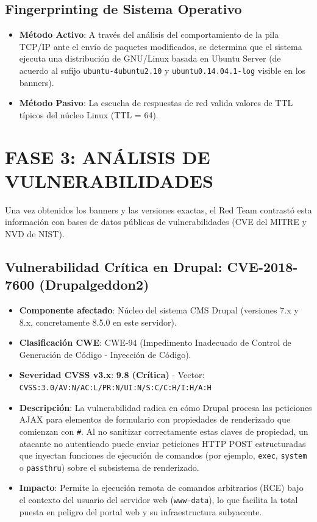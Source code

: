 \documentclass[11pt,a4paper]{article}
\begin{document}
\subsection{Fingerprinting de Sistema Operativo}
\begin{itemize}
    \item \textbf{Método Activo}: A través del análisis del comportamiento de la pila TCP/IP ante el envío de paquetes modificados, se determina que el sistema ejecuta una distribución de GNU/Linux basada en Ubuntu Server (de acuerdo al sufijo \texttt{ubuntu-4ubuntu2.10} y \texttt{ubuntu0.14.04.1-log} visible en los banners).
    \item \textbf{Método Pasivo}: La escucha de respuestas de red valida valores de TTL típicos del núcleo Linux (TTL = 64).
\end{itemize}


\section{FASE 3: ANÁLISIS DE VULNERABILIDADES}
Una vez obtenidos los banners y las versiones exactas, el Red Team contrastó esta información con bases de datos públicas de vulnerabilidades (CVE del MITRE y NVD de NIST).

\subsection{Vulnerabilidad Crítica en Drupal: CVE-2018-7600 (Drupalgeddon2)}
\begin{itemize}
    \item \textbf{Componente afectado}: Núcleo del sistema CMS Drupal (versiones 7.x y 8.x, concretamente 8.5.0 en este servidor).
    \item \textbf{Clasificación CWE}: CWE-94 (Impedimento Inadecuado de Control de Generación de Código - Inyección de Código).
    \item \textbf{Severidad CVSS v3.x}: \textbf{9.8 (Crítica)} - Vector: \texttt{CVSS:3.0/AV:N/AC:L/PR:N/UI:N/S:C/C:H/I:H/A:H}
    \item \textbf{Descripción}: La vulnerabilidad radica en cómo Drupal procesa las peticiones AJAX para elementos de formulario con propiedades de renderizado que comienzan con \texttt{\#}. Al no sanitizar correctamente estas claves de propiedad, un atacante no autenticado puede enviar peticiones HTTP POST estructuradas que inyectan funciones de ejecución de comandos (por ejemplo, \texttt{exec}, \texttt{system} o \texttt{passthru}) sobre el subsistema de renderizado.
    \item \textbf{Impacto}: Permite la ejecución remota de comandos arbitrarios (RCE) bajo el contexto del usuario del servidor web (\texttt{www-data}), lo que facilita la total puesta en peligro del portal web y su infraestructura subyacente.
\end{itemize}
\end{document}
